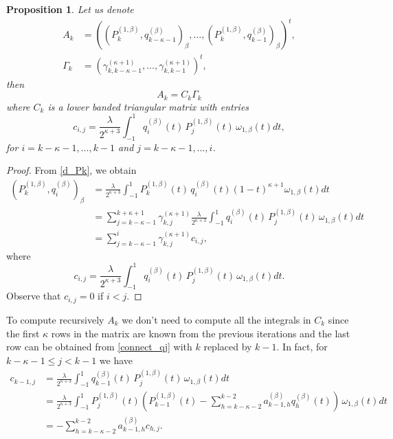 \documentclass{amsart}
\theoremstyle{plain}%
\newtheorem{prop}[thm]{Proposition}
\theoremstyle{definition}
\theoremstyle{remark}
\begin{document}
\begin{prop}
Let us denote
\begin{align*}
 A_k &= ((P_{k}^{(1, \beta)}, q_{k-\kappa-1}^{(\beta)})_{\beta}, \ldots, (P_{k}^{(1, \beta)}, q_{k-1}^{(\beta)})_{\beta})^t,\\
 \Gamma_k &= (\gamma_{k,k-\kappa-1}^{(\kappa+1)}, \ldots, \gamma_{k,k-1}^{(\kappa+1)})^t,
\end{align*}
then 
\[
A_k = C_k \Gamma_k
\]
where \(C_k\) is a lower banded triangular matrix with entries 
\[
c_{i,j} = \frac{\lambda}{2^{\kappa+3}} \int_{-1}^1
q_i^{(\beta)}(t) \, P_{j}^{(1, \beta)}(t)\,
 \omega_{1,\beta}(t) dt,
\] 
for \(i=k-\kappa-1,\ldots,k-1\) and \(j=k-\kappa-1,\ldots,i\).
\end{prop}
\begin{proof}
From \eqref{d_Pk}, we obtain
\begin{align}
(P_{k}^{(1, \beta)}, q_i^{(\beta)})_{\beta} &= \frac{\lambda}{2^{\kappa+3}} \int_{-1}^1
P_{k}^{(1, \beta)}(t)\, q_i^{(\beta)}(t)(1-t)^{\kappa+1}
 \omega_{1,\beta}(t) dt \nonumber\\
&= \sum_{j=k-\kappa-1}^{k+\kappa+1} \gamma_{k,j}^{(\kappa+1)} \frac{\lambda}{2^{\kappa+3}} \int_{-1}^1 
q_i^{(\beta)}(t) \, P_{j}^{(1, \beta)}(t)\,
 \omega_{1,\beta}(t) dt \label{Pk_qi}\\
 &= \sum_{j=k-\kappa-1}^{i} \gamma_{k,j}^{(\kappa+1)} c_{i,j},\nonumber
\end{align}
where
\[
c_{i,j} = \frac{\lambda}{2^{\kappa+3}} \int_{-1}^1
q_i^{(\beta)}(t) \, P_{j}^{(1, \beta)}(t)\,
 \omega_{1,\beta}(t) dt.
\]
Observe that \(c_{i,j} =0\) if \(i<j\).
\end{proof}


To compute recursively \(A_k\) we don't need to compute all the integrals in \(C_k\) since the first \(\kappa\) rows in the matrix are known from the previous iterations and the last row 
can be obtained from \eqref{connect_qj} with \(k\) replaced by \(k-1\). In fact, for \(k-\kappa-1\leqslant j<k-1\) we have
\begin{align*}
c_{k-1,j} &= \frac{\lambda}{2^{\kappa+3}} \int_{-1}^1
q_{k-1}^{(\beta)}(t) \, P_{j}^{(1, \beta)}(t)\,
 \omega_{1,\beta}(t) dt \\
 &=\frac{\lambda}{2^{\kappa+3}} \int_{-1}^1
 P_{j}^{(1, \beta)}(t)\left( P_{k-1}^{(1, \beta)}(t) - \sum_{h=k-\kappa-2}^{k-2}  a^{(\beta)}_{k-1,h} q_h^{(\beta)}(t)\right)\,
 \omega_{1,\beta}(t) dt \\
&= - \sum_{h=k-\kappa-2}^{k-2} a^{(\beta)}_{k-1,h} c_{h,j}.
\end{align*}
\end{document}
